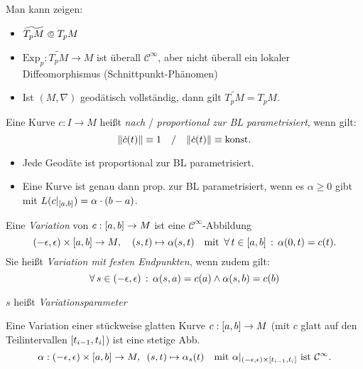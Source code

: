 \documentclass{cheat-sheet}
\newcommand{\Exp}{\mathrm{Exp}} %
\newcommand{\vinterval}{\ointerval{-\epsilon}{\epsilon}} %
\begin{document}
\begin{bem}
  Man kann zeigen:
  \begin{itemize}
    \item $\widetilde{T_p M} \opn T_p M$
    \item $\Exp_p : \widetilde{T_p M} \to M$ ist überall $\mathcal{C}^\infty$, aber nicht überall ein lokaler Diffeomorphismus (Schnittpunkt-Phänomen)
    \item Ist $(M, \nabla)$ geodätisch vollständig, dann gilt $\widetilde{T_p M} = T_p M$.
  \end{itemize}
\end{bem}



\begin{defn}
  Eine Kurve $c : I \to M$ heißt \emph{nach} / \emph{proportional zur BL parametrisiert}, wenn gilt:
  \[
    \lVert\dot{c}(t)\rVert \equiv 1
    \quad / \quad
    \lVert\dot{c}(t)\rVert \equiv \text{konst}.
  \]
\end{defn}

\begin{bem}
  \begin{itemize}
    \item Jede Geodäte ist proportional zur BL parametrisiert.
    \item Eine Kurve ist genau dann prop. zur BL parametrisiert, wenn es $\alpha \geq 0$ gibt mit $L(c|_{\left[ a, b \right]}) = \alpha \cdot (b - a)$.
  \end{itemize}
\end{bem}

\begin{defn}
  Eine \emph{Variation} von $c : \left[ a, b \right] \to M$ ist eine $\mathcal{C}^\infty$-Abbildung
  \[
    \vinterval \times \cinterval{a}{b} \to M, \quad
    (s, t) \mapsto \alpha(s, t)
    \quad \text{mit} \enspace
    \fa{t \in \cinterval{a}{b}} \alpha(0, t) = c(t).
  \]
  Sie heißt \emph{Variation mit festen Endpunkten}, wenn zudem gilt:
  \[
    \forall \, {s \in \left( -\epsilon, \epsilon \right)} \,:\,
    \alpha(s, a) = c(a) \wedge \alpha(s, b) = c(b)
  \]
\end{defn}

\begin{sprech}
  $s$ heißt \emph{Variationsparameter}
\end{sprech}

\begin{defn}
  Eine Variation einer stückweise glatten Kurve $c : \left[ a, b \right] \to M$ (mit $c$ glatt auf den Teilintervallen $\left[ t_{i-1}, t_i \right]$) ist eine stetige Abb.
  \[
    \alpha : \vinterval \times \cinterval{a}{b} \to M,
    \enspace (s, t) \mapsto \alpha_s(t)
    \quad \text{mit }
    \alpha|_{\vinterval \times \cinterval{t_{i-1}}{t_i}} \text{ ist } \mathcal{C}^\infty.
  \]
\end{defn}
\end{document}
